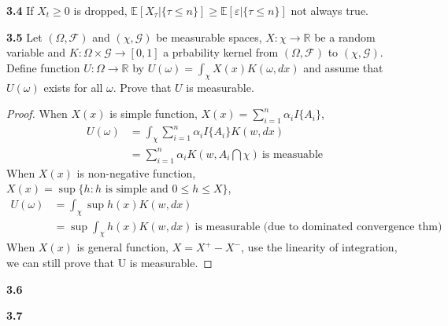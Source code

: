 \noindent\textbf{3.4} If $X_t\ge0$ is dropped, $\mathbb{E}[X_\tau|\{\tau\le n\}] \ge \mathbb{E}[\varepsilon|\{\tau\le n\}]$ not always true.




\noindent\textbf{3.5}
Let $(\Omega, \mathcal{F})$ and $(\chi,\mathcal{G})$ be measurable spaces, $X: \chi \to \mathbb{R}$ be a random variable and $K: \Omega\times \mathcal{G} \to [0,1]$ a prbability kernel from $(\Omega, \mathcal{F})$ to $(\chi,\mathcal{G})$. Define function $U:\Omega \to \mathbb{R}$ by $U(\omega) = \int_\chi X(x) K(\omega,dx)$ and assume that $U(\omega)$ exists for all $\omega$. Prove that $U$ is measurable. 
\begin{proof}
    When $X(x)$ is simple function, $X(x) = \sum_{i = 1}^n \alpha_i I\{A_i\}$,
    \begin{equation}
        \begin{aligned}
            U(\omega) &= \int_\chi \sum_{i = 1}^n \alpha_i I\{A_i\} K(w,dx)\\
            &= \sum_{i = 1}^n \alpha_i K(w,A_i\bigcap\chi)\ \text{is measuable}
        \end{aligned}
    \end{equation}
    When $X(x)$ is non-negative function, $X(x) = \sup \{h: h \text{ is simple and } 0\leq h \leq X\}$, 
    \begin{equation}
        \begin{aligned}
            U(\omega) &= \int_\chi \sup h(x) K(w,dx)\\
            & = \sup \int_\chi h(x) K(w,dx) \ \text{is measurable (due to dominated convergence thm)} 
        \end{aligned}
    \end{equation}
    When $X(x)$ is general function, $X = X^+ - X^-$, use the linearity of integration, we can still prove that U is measurable. 
\end{proof}



\noindent\textbf{3.6}


\noindent\textbf{3.7}